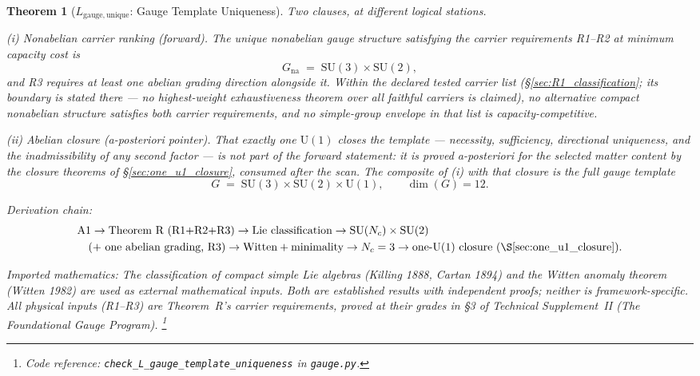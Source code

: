 \documentclass[11pt]{article}
\newtheorem{theorem}{Theorem}[section]
\theoremstyle{definition}
\newcommand{\SU}{\mathrm{SU}}
\newcommand{\U}{\mathrm{U}}
\newcommand{\coderef}[2]{\footnote{Code reference: \texttt{#1} in \texttt{#2}.}}
\newcommand{\TSII}{Technical Supplement~II (\emph{The Foundational Gauge Program})}
\begin{document}
\begin{theorem}[$L_{\mathrm{gauge,unique}}$: Gauge Template Uniqueness]\label{thm:gauge_unique}
Two clauses, at different logical stations.

\smallskip\noindent\textit{(i) Nonabelian carrier ranking (forward).}\quad
The unique nonabelian gauge structure satisfying the carrier
requirements R1--R2 at minimum capacity cost is
\[
  G_{\mathrm{na}} \;=\; \SU(3) \times \SU(2),
\]
and R3 requires at least one abelian grading direction alongside it.
Within the declared tested carrier list
(\S\ref{sec:R1_classification}; its boundary is stated there --- no
highest-weight exhaustiveness theorem over all faithful carriers is
claimed), no alternative compact nonabelian structure satisfies both
carrier requirements, and no simple-group envelope in that list is
capacity-competitive.

\smallskip\noindent\textit{(ii) Abelian closure (a-posteriori pointer).}\quad
That exactly one $\U(1)$ closes the template --- necessity,
sufficiency, directional uniqueness, and the inadmissibility of any
second factor --- is not part of the forward statement: it is proved
a-posteriori for the selected matter content by the closure theorems
of \S\ref{sec:one_u1_closure}, consumed after the scan.  The composite
of (i) with that closure is the full gauge template
\[
  G \;=\; \SU(3) \times \SU(2) \times \U(1),
  \qquad \dim(G) = 12.
\]

\smallskip\noindent\textit{Derivation chain:}
\begin{align*}
&\text{A1} \to \text{Theorem R (R1+R2+R3)} \to
\text{Lie classification} \to
\SU(N_c) \times \SU(2)\\
&\quad (+\text{ one abelian grading, R3})
\to \text{Witten} + \text{minimality} \to N_c = 3 \to
\text{one-U(1) closure (\S\ref{sec:one_u1_closure})}.
\end{align*}

\smallskip\noindent\textit{Imported mathematics:}\quad
The classification of compact simple Lie algebras (Killing 1888, Cartan 1894)
and the Witten anomaly theorem (Witten 1982) are used as external
mathematical inputs.  Both are established results with independent
proofs; neither is framework-specific.  All physical inputs (R1--R3)
are Theorem~R's carrier requirements, proved at their grades in
\S3 of \TSII{}.
\coderef{check\_L\_gauge\_template\_uniqueness}{gauge.py}
\end{theorem}

\newpage


\end{document}
